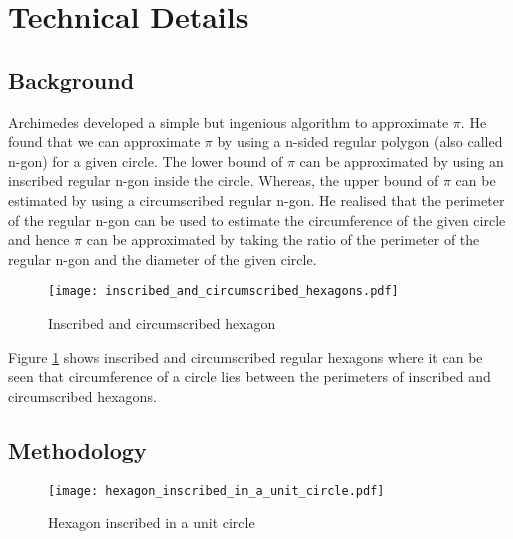 \documentclass[12pt]{article}
\begin{document}
\section {Technical Details}
\iffalse It gives the mathematical background of the topic and states the methodology used for studying the topic. Can also include computer program. If run for 5 or 6 pages, then you should make sub sections for background, methodology and code. You should explain the inputs of the program, explain what the programs does on higher level and what are the outputs of the program.\fi

\subsection{Background}
Archimedes developed a simple but ingenious algorithm to approximate $\pi$. He found that we can approximate $\pi$ by using a n-sided regular polygon (also called n-gon) for a given circle. The lower bound of $\pi$ can be approximated by using an inscribed regular n-gon inside the circle. Whereas, the upper bound of $\pi$ can be estimated by using a circumscribed regular n-gon. He realised that the perimeter of the regular n-gon can be used to estimate the circumference of the given circle and hence $\pi$ can be approximated by taking the ratio of the perimeter of the regular n-gon and the diameter of the given circle.\\

\begin{figure}[h!]
  \texttt{[image: inscribed\_and\_circumscribed\_hexagons.pdf]}
  \caption{Inscribed and circumscribed hexagon}
  \label{fig:ics}
\end{figure}
Figure \ref{fig:ics} shows inscribed and circumscribed regular hexagons where it can be seen that circumference of a circle lies between the perimeters of inscribed and circumscribed hexagons.\\
\bigskip

\subsection{Methodology}

\begin{figure}[h!]
  \texttt{[image: hexagon\_inscribed\_in\_a\_unit\_circle.pdf]}
  \caption{Hexagon inscribed in a unit circle}
  \label{fig:hiuc}
\end{figure}
\end{document}
